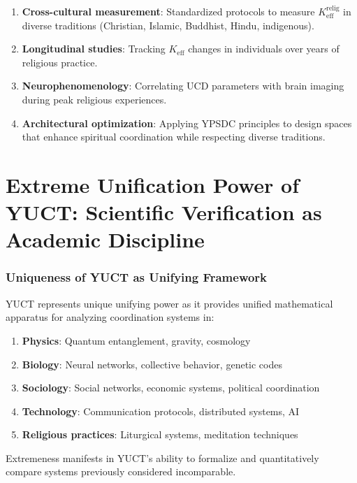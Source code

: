 \documentclass[12pt,a4paper]{article}
\begin{document}
	\begin{enumerate}
		\item \textbf{Cross-cultural measurement}: Standardized protocols to measure $K_{\mathrm{eff}}^{\mathrm{relig}}$ in diverse traditions (Christian, Islamic, Buddhist, Hindu, indigenous).
		
		\item \textbf{Longitudinal studies}: Tracking $K_{\mathrm{eff}}$ changes in individuals over years of religious practice.
		
		\item \textbf{Neurophenomenology}: Correlating UCD parameters with brain imaging during peak religious experiences.
		
		\item \textbf{Architectural optimization}: Applying YPSDC principles to design spaces that enhance spiritual coordination while respecting diverse traditions.
	\end{enumerate}
	
	\newpage
	\part{Extreme Unification Power of YUCT: Scientific Verification as Academic Discipline}
	
	\section{Uniqueness of YUCT as Unifying Framework}
	
	YUCT represents unique unifying power as it provides unified mathematical apparatus for analyzing coordination systems in:
	
	\begin{enumerate}
		\item \textbf{Physics}: Quantum entanglement, gravity, cosmology
		\item \textbf{Biology}: Neural networks, collective behavior, genetic codes
		\item \textbf{Sociology}: Social networks, economic systems, political coordination
		\item \textbf{Technology}: Communication protocols, distributed systems, AI
		\item \textbf{Religious practices}: Liturgical systems, meditation techniques
	\end{enumerate}
	
	Extremeness manifests in YUCT's ability to formalize and quantitatively compare systems previously considered incomparable.
	
\end{document}

